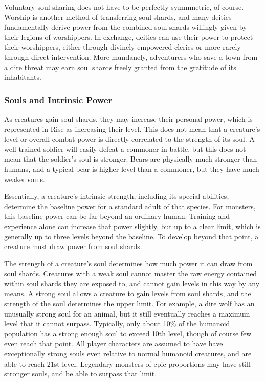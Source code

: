             Voluntary soul sharing does not have to be perfectly symmmetric, of course.
            Worship is another method of transferring soul shards, and many deities fundamentally derive power from the combined soul shards willingly given by their legions of worshippers.
            In exchange, deities can use their power to protect their worshippers, either through divinely empowered clerics or more rarely through direct intervention.
            More mundanely, adventurers who save a town from a dire threat may earn soul shards freely granted from the gratitude of its inhabitants.

        \subsubsection{Souls and Intrinsic Power}
            As creatures gain soul shards, they may increase their personal power, which is represented in Rise as increasing their level.
            This does not mean that a creature's level or overall combat power is directly correlated to the strength of its soul.
            A well-trained soldier will easily defeat a commoner in battle, but this does not mean that the soldier's soul is stronger.
            Bears are physically much stronger than humans, and a typical bear is higher level than a commoner, but they have much weaker souls.

            Essentially, a creature's intrinsic strength, including its special abilities, determine the baseline power for a standard adult of that species.
            For monsters, this baseline power can be far beyond an ordinary human.
            Training and experience alone can increase that power slightly, but up to a clear limit, which is generally up to three levels beyond the baseline.
            To develop beyond that point, a creature must draw power from soul shards.

            The strength of a creature's soul determines how much power it can draw from soul shards.
            Creatures with a weak soul cannot master the raw energy contained within soul shards they are exposed to, and cannot gain levels in this way by any means.
            A strong soul allows a creature to gain levels from soul shards, and the strength of the soul determines the upper limit.
            For example, a dire wolf has an unusually strong soul for an animal, but it still eventually reaches a maximum level that it cannot surpass.
            Typically, only about 10\% of the humanoid population has a strong enough soul to exceed 10th level, though of course few even reach that point.
            All player characters are assumed to have have exceptionally strong souls even relative to normal humanoid creatures, and are able to reach 21st level.
            Legendary monsters of epic proportions may have still stronger souls, and be able to surpass that limit.

